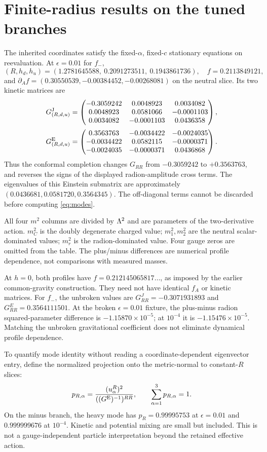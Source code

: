 \section{Finite-radius results on the tuned branches}

The inherited coordinates satisfy the fixed-$\alpha$, fixed-$c$ stationary equations on reevaluation. At $\epsilon=0.01$ for $f_-$,
\begin{equation}
 (R,h_d,h_u)=(1.2781645588,\ 0.2091273511,\ 0.1943861736),\quad
 f=0.2113849121,
\end{equation}
and $\partial_A f=(0.30550539,-0.00384452,-0.00268081)$ on the neutral slice. Its two kinetic matrices are
\begin{align}
 G^{\mathrm J}_{(R,d,u)}&=\begin{pmatrix}-0.3059242 & 0.0048923 & 0.0034082\\0.0048923 & 0.0581066 & -0.0001103\\0.0034082 & -0.0001103 & 0.0436358\end{pmatrix},\\[2pt]
 G^{\mathrm E}_{(R,d,u)}&=\begin{pmatrix}0.3563763 & -0.0034422 & -0.0024035\\-0.0034422 & 0.0582115 & -0.0000371\\-0.0024035 & -0.0000371 & 0.0436868\end{pmatrix}.
\end{align}
Thus the conformal completion changes $G_{RR}$ from $-0.3059242$ to $+0.3563763$, and reverses the signs of the displayed radion-amplitude cross terms. The eigenvalues of this Einstein submatrix are approximately $(0.0436681,0.0581720,0.3564345)$. The off-diagonal terms cannot be discarded before computing \eqref{eq:modes}.

\begin{center}
\small\resizebox{\linewidth}{!}{\BranchTable}
\end{center}
All four $m^2$ columns are divided by $\Lambda^2$ and are parameters of the two-derivative action. $m_C^2$ is the doubly degenerate charged value; $m_1^2,m_2^2$ are the neutral scalar-dominated values; $m_r^2$ is the radion-dominated value. Four gauge zeros are omitted from the table. The plus/minus differences are numerical profile dependence, not comparisons with measured masses.

At $h=0$, both profiles have $f=0.212145065817\ldots$, as imposed by the earlier common-gravity construction. They need not have identical $f_A$ or kinetic matrices. For $f_-$, the unbroken values are $G^J_{RR}=-0.3071931893$ and $G^E_{RR}=0.3564111501$. At the broken $\epsilon=0.01$ fixture, the plus-minus radion squared-parameter difference is $-1.15870\times10^{-5}$; at $10^{-4}$ it is $-1.15476\times10^{-5}$. Matching the unbroken gravitational coefficient does not eliminate dynamical profile dependence.

To quantify mode identity without reading a coordinate-dependent eigenvector entry, define the normalized projection onto the metric-normal to constant-$R$ slices:
\begin{equation}
 p_{R,\alpha}=\frac{(u_\alpha^R)^2}{((G^{\mathrm E})^{-1})^{RR}},\qquad
 \sum_{\alpha=1}^3p_{R,\alpha}=1.
\end{equation}
On the minus branch, the heavy mode has $p_R=0.99995753$ at $\epsilon=0.01$ and $0.999999676$ at $10^{-4}$. Kinetic and potential mixing are small but included. This is not a gauge-independent particle interpretation beyond the retained effective action.

